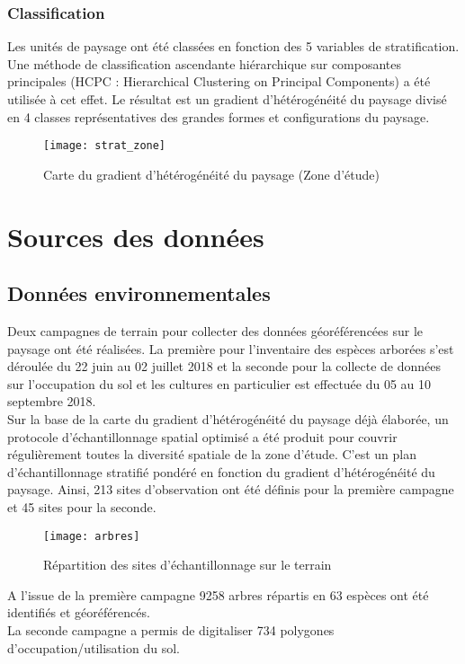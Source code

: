 \documentclass[a4paper, oneside, 12pt]{book}
\begin{document}
\subsubsection{Classification}
Les unités de paysage ont été classées en fonction des 5 variables de stratification. Une méthode de classification ascendante hiérarchique sur composantes principales (HCPC : Hierarchical Clustering on Principal Components) a été utilisée à cet effet.
Le résultat est un gradient d’hétérogénéité du paysage divisé en 4 classes représentatives des grandes formes et configurations du paysage.
\begin{figure}[H]
	\centering
	\caption{Carte du gradient d’hétérogénéité du paysage (Zone d’étude)}
	\texttt{[image: strat\_zone]}	
\end{figure}
\section{Sources des données}
\subsection{Données environnementales}
Deux campagnes de terrain pour collecter des données géoréférencées sur le paysage ont été réalisées. La première pour l’inventaire des espèces arborées s’est déroulée du 22 juin au 02 juillet 2018 et la seconde pour la collecte de données sur l’occupation du sol et les cultures en particulier est effectuée du 05 au 10 septembre 2018.\\

Sur la base de la carte du gradient d’hétérogénéité du paysage déjà élaborée, un protocole d'échantillonnage spatial optimisé a été produit pour couvrir régulièrement toutes la diversité spatiale de la zone d’étude. C’est un plan d’échantillonnage stratifié pondéré en fonction du gradient d’hétérogénéité du paysage. Ainsi, 213 sites d’observation ont été définis pour la première campagne et 45 sites pour la seconde.
\begin{figure}[H]
	\centering
	\caption{Répartition des sites d’échantillonnage sur le terrain}
	\texttt{[image: arbres]}	
\end{figure}
A l’issue de la première campagne 9258 arbres répartis en 63 espèces ont été identifiés et géoréférencés.\\

La seconde campagne a permis de digitaliser 734 polygones d’occupation/utilisation du sol.
\end{document}
